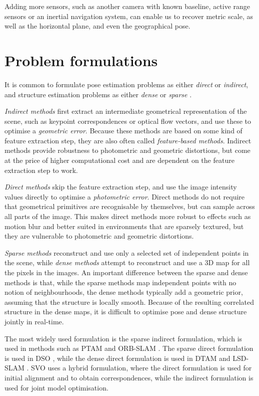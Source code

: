 Adding more sensors, such as another camera with known baseline, active range sensors or an inertial navigation system, can enable us to recover metric scale, as well as the horizontal plane, and even the geographical pose.

\section{Problem formulations}
It is common to formulate pose estimation problems as either \emph{direct} or \emph{indirect}, and structure estimation problems as either \emph{dense} or \emph{sparse} \cite{Engel2017DirectOdometry}.

\emph{Indirect methods} first extract an intermediate geometrical representation of the scene, such as keypoint correspondences or optical flow vectors, and use these to optimise a \emph{geometric error}.
Because these methods are based on some kind of feature extraction step, they are also often called \emph{feature-based methods}.
Indirect methods provide robustness to photometric and geometric distortions, but come at the price of higher computational cost and are dependent on the feature extraction step to work.

\emph{Direct methods} skip the feature extraction step, and use the image intensity values directly to optimise a \emph{photometric error}.
Direct methods do not require that geometrical primitives are recognisable by themselves, but can sample across all parts of the image.
This makes direct methods more robust to effects such as motion blur and better suited in environments that are sparsely textured, but they are vulnerable to photometric and geometric distortions.

\emph{Sparse methods} reconstruct and use only a selected set of independent points in the scene, while \emph{dense methods} attempt to reconstruct and use a 3D map for all the pixels in the images.
An important difference between the sparse and dense methods is that, while the sparse methods map independent points with no notion of neighbourhoods, the dense methods typically add a geometric prior, assuming that the structure is locally smooth.
Because of the resulting correlated structure in the dense maps, it is difficult to optimise pose and dense structure jointly in real-time.

The most widely used formulation is the sparse indirect formulation, which is used in methods such as PTAM \cite{Klein2007ParallelWorkspaces} and ORB-SLAM \cite{Mur-Artal2015ORB-SLAM:System}.
The sparse direct formulation is used in DSO \cite{Engel2017DirectOdometry}, while the dense direct formulation is used in DTAM \cite{Newcombe2011DTAM:Real-time} and LSD-SLAM \cite{Engel2014LSD-SLAM:SLAM}.
SVO \cite{Forster2014SVO:Odometry} uses a hybrid formulation, where the direct formulation is used for initial alignment and to obtain correspondences, while the indirect formulation is used for joint model optimisation.

